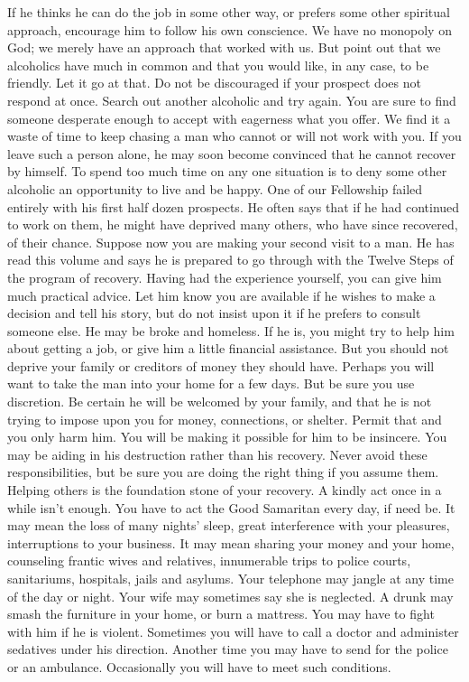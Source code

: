 \begin{biblechapter}
If he thinks he can do the job in some other way, or prefers some other spiritual approach, encourage him to follow his own conscience.  We have no monopoly on God; we merely have an approach that worked with us.  But point out that we alcoholics have much in common and that you would like, in any case, to be friendly.  Let it go at that.
Do not be discouraged if your prospect does not respond at once.  Search out another alcoholic and try again.  You are sure to find someone desperate enough to accept with eagerness what you offer.  We find it a waste of time to keep chasing a man who cannot or will not work with you.  If you leave such a person alone, he may soon become convinced that he cannot recover by himself.  To spend too much time on any one situation is to deny some other alcoholic an opportunity to live and be happy.  One of our Fellowship failed entirely with his first half dozen prospects.  He often says that if he had continued to work on them, he might have deprived many others, who have since recovered, of their chance.
Suppose now you are making your second visit to a man.  He has read this volume and says he is prepared to go through with the Twelve Steps of the program of recovery.  Having had the experience yourself, you can give him much practical advice.  Let him know you are available if he wishes to make a decision and tell his story, but do not insist upon it if he prefers to consult someone else.
He may be broke and homeless.  If he is, you might try to help him about getting a job, or give him a little financial assistance.  But you should not deprive your family or creditors of money they should have.  Perhaps you will want to take the man into your home for a few days.  But be sure you use discretion.  Be certain he will be welcomed by your family, and that he is not trying to impose upon you for money, connections, or shelter.  Permit that and you only harm him.  You will be making it possible for him to be insincere.  You may be aiding in his destruction rather than his recovery.
Never avoid these responsibilities, but be sure you are doing the right thing if you assume them.  Helping others is the foundation stone of your recovery.  A kindly act once in a while isn't enough.  You have to act the Good Samaritan every day, if need be.  It may mean the loss of many nights' sleep, great interference with your pleasures, interruptions to your business.  It may mean sharing your money and your home, counseling frantic wives and relatives, innumerable trips to police courts, sanitariums, hospitals, jails and asylums.  Your telephone may jangle at any time of the day or night.  Your wife may sometimes say she is neglected.  A drunk may smash the furniture in your home, or burn a mattress.  You may have to fight with him if he is violent.  Sometimes you will have to call a doctor and administer sedatives under his direction.  Another time you may have to send for the police or an ambulance.  Occasionally you will have to meet such conditions.

\end{biblechapter}

